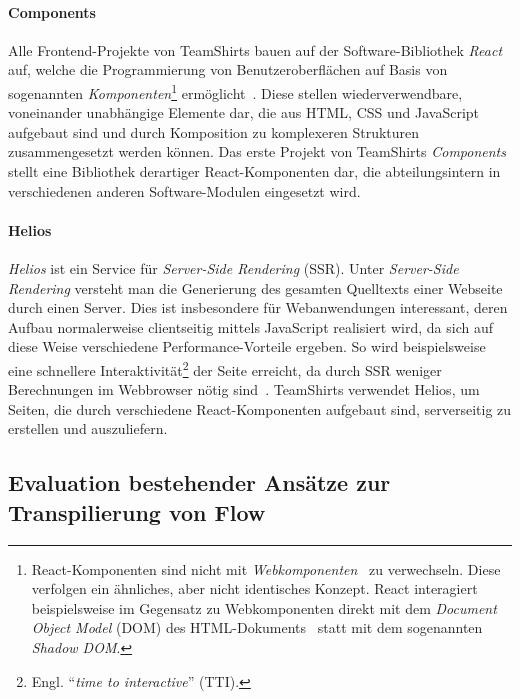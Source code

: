 \paragraph{Components}
Alle Frontend-Projekte von TeamShirts bauen auf der Software-Bibliothek \textit{React}~\autocite{SOFTWARE:REACT} auf, welche die Programmierung von Benutzeroberflächen auf Basis von sogenannten \emph{Komponenten}\footnote{React-Komponenten sind nicht mit \textit{Webkomponenten}~\autocite{MDN:WEBCOMPONENTS} zu verwechseln. Diese verfolgen ein ähnliches, aber nicht identisches Konzept. React interagiert beispielsweise im Gegensatz zu Webkomponenten direkt mit dem \textit{Document Object Model} (DOM) des HTML-Dokuments~\autocite{REACT:WEBCOMPONENTS} statt mit dem sogenannten \textit{Shadow DOM}.} ermöglicht~\autocite{ACM:REACT}. Diese stellen wiederverwendbare, voneinander unabhängige Elemente dar, die aus HTML, CSS und JavaScript aufgebaut sind und durch Komposition zu komplexeren Strukturen zusammengesetzt werden können. Das erste Projekt von TeamShirts \textit{Components} stellt eine Bibliothek derartiger React-Komponenten dar, die abteilungsintern in verschiedenen anderen Software-Modulen eingesetzt wird.

\vspace{-0.5\baselineskip}
\paragraph{Helios}
\textit{Helios} ist ein Service für \emph{Server-Side Rendering} (SSR). Unter \emph{Server-Side Rendering} versteht man die Generierung des gesamten Quelltexts einer Webseite durch einen Server. Dies ist insbesondere für Webanwendungen interessant, deren Aufbau normalerweise clientseitig mittels JavaScript realisiert wird, da sich auf diese Weise verschiedene Performance-Vorteile ergeben. So wird beispielsweise eine schnellere Interaktivität\footnote{Engl. \enquote{\textit{time to interactive}} (TTI).} der Seite erreicht, da durch SSR weniger Berechnungen im Webbrowser nötig sind~\autocite{GOOGLE:RENDERING_ON_THE_WEB}. TeamShirts verwendet Helios, um Seiten, die durch verschiedene React-Komponenten aufgebaut sind, serverseitig zu erstellen und auszuliefern.

\subsection{Evaluation bestehender Ansätze zur Transpilierung von Flow}
\label{sec:evaluation-other-transpilers}

